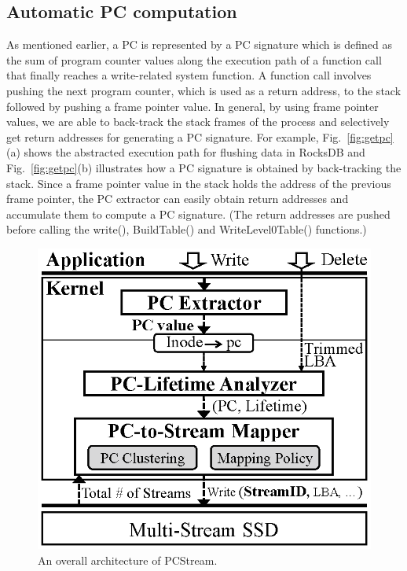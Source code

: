 \subsection{Automatic PC computation}
\vspace{-5pt}
As mentioned earlier, a PC is represented by a PC signature which is defined as
the sum of program counter values along the execution path of a function call that
finally reaches a write-related system function. A function call involves
pushing the next program counter, which is used as a return address, to the
stack followed by pushing a frame pointer value.  In general, by using frame
pointer values, we are able to back-track the stack frames of the process and
selectively get return addresses for generating a PC signature.  For example,
Fig.~\ref{fig:getpc}(a) shows the abstracted execution path for flushing data
in RocksDB and Fig.~\ref{fig:getpc}(b) illustrates how a PC signature is obtained
by back-tracking the stack.  
Since a frame pointer value in the stack holds the address of the previous
frame pointer, the PC extractor can easily obtain return addresses and
accumulate them to compute a PC signature. (The return addresses are pushed
before calling the \textsf{\small  write()}, \textsf{\small  BuildTable()} and \textsf{\small 
WriteLevel0Table()} functions.)

\begin{figure}[t]
	\centering
	\vspace{-7pt}
	\includegraphics[width=0.6\linewidth]{figure/architecture4}
	\vspace{-10pt}
	\caption{An overall architecture of \textsf{\small PCStream}.}
	\label{fig:architecture}
	\vspace{-20pt}
\end{figure}


